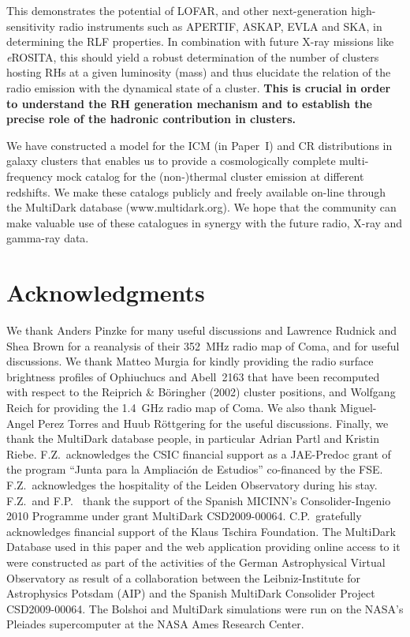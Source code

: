 \documentclass[useAMS,usenatbib]{mn2e}
\begin{document}
This demonstrates the potential of LOFAR, and other next-generation
high-sensitivity radio instruments such as APERTIF, ASKAP, EVLA and SKA, in
determining the RLF properties. In combination with future X-ray missions like
\emph{e}ROSITA, this should yield a robust determination of the number of
clusters hosting RHs at a given luminosity (mass) and thus elucidate the
relation of the radio emission with the dynamical state of a cluster.
{\bf This is crucial in order to understand the RH generation mechanism and to
establish the precise role of the hadronic contribution in clusters.}

We have constructed a model for the ICM (in Paper~I) and CR distributions 
in galaxy clusters that enables us to provide a cosmologically complete multi-frequency mock 
catalog for the \mbox{(non-)thermal} cluster emission at different redshifts. We make these 
catalogs publicly and freely available on-line through the MultiDark database (www.multidark.org). 
We hope that the community can make valuable use of these catalogues in
synergy with the future radio, X-ray and gamma-ray data.


\section*{Acknowledgments}
We thank Anders Pinzke for many useful discussions and Lawrence Rudnick and Shea
Brown for a reanalysis of their 352~MHz radio map of Coma, and for useful
discussions. We thank Matteo Murgia for kindly providing the radio surface
brightness profiles of Ophiuchucs and Abell~2163 that have been recomputed with
respect to the Reiprich \& B\"{o}ringher (2002) cluster positions, and Wolfgang
Reich for providing the 1.4~GHz radio map of Coma.  We also thank Miguel-Angel
Perez Torres and Huub R{\"o}ttgering for the useful discussions.  Finally, we
thank the MultiDark database people, in particular Adrian Partl and Kristin
Riebe.  F.Z.{\ }acknowledges the CSIC financial support as a JAE-Predoc grant of
the program ``Junta para la Ampliaci\'on de Estudios'' co-financed by the FSE.
F.Z.{\ }acknowledges the hospitality of the Leiden Observatory during his stay.
F.Z.{\ }and F.P.{\ } thank the support of the Spanish MICINN's
Consolider-Ingenio 2010 Programme under grant MultiDark CSD2009-00064. C.P.{\
}gratefully acknowledges financial support of the Klaus Tschira Foundation. The
MultiDark Database used in this paper and the web application providing online
access to it were constructed as part of the activities of the German
Astrophysical Virtual Observatory as result of a collaboration between the
Leibniz-Institute for Astrophysics Potsdam (AIP) and the Spanish MultiDark
Consolider Project CSD2009-00064. The Bolshoi and MultiDark simulations were run
on the NASA's Pleiades supercomputer at the NASA Ames Research Center.
\end{document}

